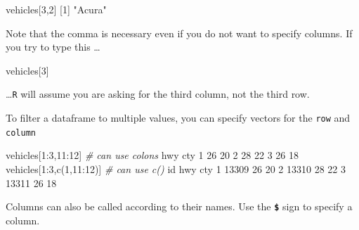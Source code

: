 \documentclass[
]{book}
\newenvironment{Shaded}{\begin{snugshade}}{\end{snugshade}}
\newcommand{\CommentTok}[1]{\textcolor[rgb]{0.56,0.35,0.01}{\textit{#1}}}
\newcommand{\DecValTok}[1]{\textcolor[rgb]{0.00,0.00,0.81}{#1}}
\newcommand{\FunctionTok}[1]{\textcolor[rgb]{0.00,0.00,0.00}{#1}}
\newcommand{\NormalTok}[1]{#1}
\newcommand{\SpecialCharTok}[1]{\textcolor[rgb]{0.00,0.00,0.00}{#1}}
\newcommand{\StringTok}[1]{\textcolor[rgb]{0.31,0.60,0.02}{#1}}
\begin{document}
\begin{Shaded}
\begin{Highlighting}[]
\NormalTok{vehicles[}\DecValTok{3}\NormalTok{,}\DecValTok{2}\NormalTok{]}
\NormalTok{[}\DecValTok{1}\NormalTok{] }\StringTok{"Acura"}
\end{Highlighting}
\end{Shaded}

Note that the comma is necessary even if you do not want to specify columns. If you try to type this \ldots{}

\begin{Shaded}
\begin{Highlighting}[]
\NormalTok{vehicles[}\DecValTok{3}\NormalTok{]}
\end{Highlighting}
\end{Shaded}

\ldots{}\texttt{R} will assume you are asking for the third column, not the third row.

To filter a dataframe to multiple values, you can specify vectors for the \texttt{row} and \texttt{column}

\begin{Shaded}
\begin{Highlighting}[]
\NormalTok{vehicles[}\DecValTok{1}\SpecialCharTok{:}\DecValTok{3}\NormalTok{,}\DecValTok{11}\SpecialCharTok{:}\DecValTok{12}\NormalTok{] }\CommentTok{\# can use colons}
\NormalTok{  hwy cty}
\DecValTok{1}  \DecValTok{26}  \DecValTok{20}
\DecValTok{2}  \DecValTok{28}  \DecValTok{22}
\DecValTok{3}  \DecValTok{26}  \DecValTok{18}
\NormalTok{vehicles[}\DecValTok{1}\SpecialCharTok{:}\DecValTok{3}\NormalTok{,}\FunctionTok{c}\NormalTok{(}\DecValTok{1}\NormalTok{,}\DecValTok{11}\SpecialCharTok{:}\DecValTok{12}\NormalTok{)]  }\CommentTok{\# can use c()}
\NormalTok{     id hwy cty}
\DecValTok{1} \DecValTok{13309}  \DecValTok{26}  \DecValTok{20}
\DecValTok{2} \DecValTok{13310}  \DecValTok{28}  \DecValTok{22}
\DecValTok{3} \DecValTok{13311}  \DecValTok{26}  \DecValTok{18}
\end{Highlighting}
\end{Shaded}

Columns can also be called according to their names. Use the \textbf{\texttt{\$}} sign to specify a column.

\begin{Shaded}
\end{Shaded}
\end{document}

